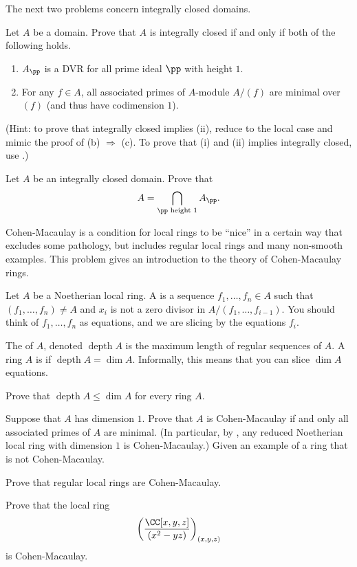 The next two problems concern integrally closed domains.
\begin{problem}
Let $A$ be a domain. Prove that $A$ is integrally closed
if and only if both of the following holds.
\begin{enumerate}[label=(\roman*)]
\item $A_\pp$ is a DVR for all prime ideal $\pp$ with height $1$.
\item For any $f\in A$, all associated primes of 
$A$-module $A/(f)$ are minimal over $(f)$
(and thus have codimension $1$).
\end{enumerate}

(Hint: to prove that integrally closed implies (ii),
reduce to the local case and mimic the proof of  (b) $\Rightarrow$ (c).
To prove that (i) and (ii) implies integrally closed,
use .)
\end{problem}
\begin{problem}
Let $A$ be an integrally closed domain. Prove that
$$A = \bigcap_{\pp \text{ height }1} A_\pp.$$
\end{problem}

\begin{problem}
\label{prob:cohen_macaulay}
Cohen-Macaulay is a condition for local rings to 
be ``nice'' in a certain way that excludes some pathology,
but includes regular local rings and many non-smooth examples.
This problem gives an introduction to 
the theory of Cohen-Macaulay rings.

Let $A$ be a Noetherian local ring. 
A  is a sequence $f_1,\dots,f_n\in A$
such that $(f_1,\dots,f_n)\neq A$ 
and $x_i$ is not a zero divisor in 
$A/(f_1,\dots,f_{i-1})$. 
You should think of $f_1,\dots,f_n$ as equations, 
and we are slicing by the equations $f_i$. 

The  of $A$, denoted $\operatorname{depth} A$ 
is the maximum length of regular sequences of $A$. 
A ring $A$ is  if 
$\operatorname{depth} A = \dim A$.
Informally, this means that you can slice $\dim A$ equations.
\begin{alphenum}
\item Prove that $\operatorname{depth} A \leq \dim A$ 
for every ring $A$.
\item Suppose that $A$ has dimension $1$. 
Prove that $A$ is Cohen-Macaulay 
if and only all associated primes of $A$ 
are minimal.
(In particular, by ,
any reduced Noetherian local ring with dimension $1$ 
is Cohen-Macaulay.) 
Given an example of a ring that is not Cohen-Macaulay.
\item Prove that regular local rings are Cohen-Macaulay.
\item Prove that the local ring
$$\left(\frac{\CC[x,y,z]}{(x^2-yz)}\right)_{(x,y,z)}$$
is Cohen-Macaulay.
\end{alphenum}
\end{problem}